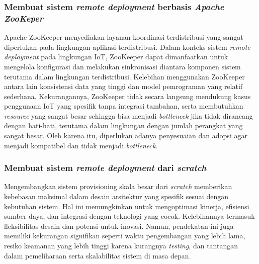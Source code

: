 \subsubsection{Membuat sistem \textit{remote deployment} berbasis \textit{Apache ZooKeper}}
Apache ZooKeeper menyediakan layanan koordinasi terdistribusi yang sangat diperlukan pada lingkungan aplikasi terdistribusi. Dalam konteks sistem \textit{remote deployment} pada lingkungan IoT, ZooKeeper dapat dimanfaatkan untuk mengelola konfigurasi dan melakukan sinkronisasi diantara komponen sistem terutama dalam lingkungan terdistribusi. Kelebihan menggunakan ZooKeeper antara lain konsistensi data yang tinggi dan model pemrograman yang relatif sederhana. Kekurangannya, ZooKeeper tidak secara langsung mendukung kasus penggunaan IoT yang spesifik tanpa integrasi tambahan, serta membutuhkan \textit{resource} yang sangat besar sehingga bisa menjadi \textit{bottleneck} jika tidak dirancang dengan hati-hati, terutama dalam lingkungan dengan jumlah perangkat yang sangat besar. Oleh karena itu, diperlukan adanya penyesuaian dan adopsi agar menjadi kompatibel dan tidak menjadi \textit{bottleneck}.

\subsubsection{Membuat sistem \textit{remote deployment} dari \textit{scratch}}
Mengembangkan sistem provisioning skala besar dari \textit{scratch} memberikan kebebasan maksimal dalam desain arsitektur yang spesifik sesuai dengan kebutuhan sistem. Hal ini memungkinkan untuk mengoptimasi kinerja, efisiensi sumber daya, dan integrasi dengan teknologi yang cocok. Kelebihannya termasuk fleksibilitas desain dan potensi untuk inovasi. Namun, pendekatan ini juga memiliki kekurangan signifikan seperti waktu pengembangan yang lebih lama, resiko keamanan yang lebih tinggi karena kurangnya \textit{testing}, dan tantangan dalam pemeliharaan serta skalabilitas sistem di masa depan.